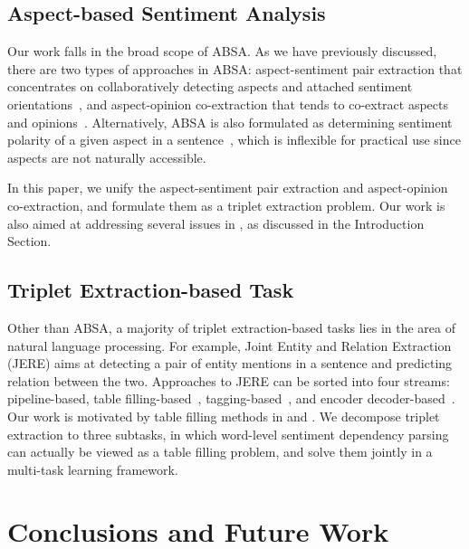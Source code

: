 \documentclass[11pt,a4paper]{article}
\begin{document}
\subsection{Aspect-based Sentiment Analysis}

Our work falls in the broad scope of ABSA. As we have previously discussed, there are two types of approaches in ABSA: aspect-sentiment pair extraction that concentrates on collaboratively detecting aspects and attached sentiment orientations~\cite{li2019unified,he2019interactive,luo2019doer,hu2019open}, and aspect-opinion co-extraction that tends to co-extract aspects and opinions~\cite{wang2017coupled,li2018aspect}. Alternatively, ABSA is also formulated as determining sentiment polarity of a given aspect in a sentence~\cite{jiang2011target,dong2014adaptive,tang2016effective,tang2016aspect,li2018transformation,zhang2019aspect}, which is inflexible for practical use since aspects are not naturally accessible.

In this paper, we unify the aspect-sentiment pair extraction and aspect-opinion co-extraction, and formulate them as a triplet extraction problem. Our work is also aimed at addressing several issues in \citet{peng2019knowing}, as discussed in the Introduction Section.

\subsection{Triplet Extraction-based Task}

Other than ABSA, a majority of triplet extraction-based tasks lies in the area of natural language processing. For example, Joint Entity and Relation Extraction (JERE) aims at detecting a pair of entity mentions in a sentence and predicting relation between the two. Approaches to JERE can be sorted into four streams: pipeline-based, table filling-based~\cite{miwa2014modeling,bekoulis2018joint,fu2019graphrel}, tagging-based~\cite{zheng2017joint}, and encoder decoder-based~\cite{zeng2018extracting}. Our work is motivated by table filling methods in \citet{miwa2014modeling} and \citet{bekoulis2018joint}. We decompose triplet extraction to three subtasks, in which word-level sentiment dependency parsing can actually be viewed as a table filling problem, and solve them jointly in a multi-task learning framework. \section{Conclusions and Future Work}
\end{document}
